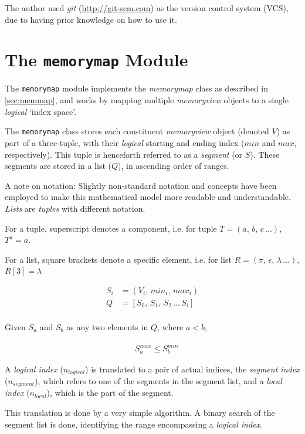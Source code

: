 \documentclass[10pt,a4paper,notitlepage]{report}
\begin{document}
The author used \emph{git} (\url{http://git-scm.com}) as the version control system (VCS), due to having prior knowledge on how to use it.

\section{The \texttt{memorymap} Module}
The \texttt{memorymap} module implements the \emph{memorymap} class as described in \ref{sec:memmap}, and works by mapping multiple \emph{memoryview} objects to a single \emph{logical} `index space'.

The \texttt{memorymap} class stores each constituent \emph{memoryview} object (denoted $V$) as part of a three-tuple,  with their \emph{logical} starting and ending index ($min$ and $max$, respectively). This tuple is henceforth referred to as a \emph{segment} (or $S$). These segments are stored in a list ($Q$), in ascending order of ranges.

{\small
A note on notation: Slightly non-standard notation and concepts have been employed to make this mathematical model more readable and understandable. \emph{Lists} are \emph{tuples} with different notation.

For a tuple, superscript denotes a component, i.e.  for tuple $T = (a,\, b,\, c\, ...)$,   $T^{a} = a$.

For a list, square brackets denote a specific element, i.e. for list $R = (\pi,\, \epsilon,\, \lambda\, ...)$, $R[3] = \lambda$
}

\begin{align*}
S_{i} &= ( V_{i},\, min_{i},\, max_{i} )\\
Q &= [ S_{0},\, S_{1},\, S_{2}\, ... \,S_{i} ]\\
\end{align*}
\begin{center}
Given $S_{a}$ and $S_{b}$ as any two elements in $Q$, where $a < b$,
\end{center}
\begin{align*}
&\ S_{a}^{max} \leq S_{b}^{min} 
\end{align*}

A \emph{logical index} ($n_{logical}$) is translated to a pair of actual indices, the \emph{segment index} ($n_{segment}$), which refers to one of the segments in the segment list, and a \emph{local index} ($n_{local}$), which is the part of the segment.

This translation is done by a very simple algorithm. A binary search of the segment list is done, identifying the range encompassing a \emph{logical index}.
\end{document}
